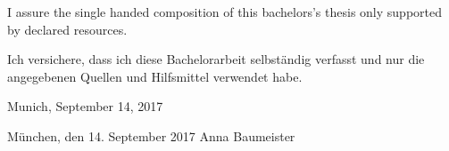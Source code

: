 \cleardoublepage



\vspace*{0.7\textheight}
\noindent I assure the single handed composition of this bachelors's thesis only supported by declared resources.

\vspace{7mm}

\noindent Ich versichere, dass ich diese Bachelorarbeit selbst\"andig verfasst und nur die angegebenen Quellen und Hilfsmittel verwendet habe.

\vspace{12mm}

\noindent Munich, September 14, 2017

\vspace{7mm}

\noindent M\"unchen, den 14. September 2017 \hspace{3cm}  Anna Baumeister
\newpage
{}